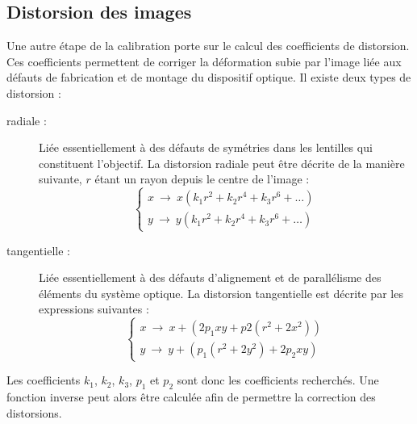 \documentclass[a4paper, 11pt]{article}
\begin{document}
	\subsection*{Distorsion des images}
		Une autre étape de la calibration porte sur le calcul des coefficients de distorsion. Ces coefficients permettent de corriger la déformation subie par l'image liée aux défauts de fabrication et de montage du dispositif optique. Il existe deux types de distorsion :
		\begin{description}
			\item[radiale :] Liée essentiellement à des défauts de symétries dans les lentilles qui constituent l'objectif. La distorsion radiale peut être décrite de la manière suivante, $r$ étant un rayon depuis le centre de l'image :
			\begin{equation}
				\left\{\begin{array}{l}
					x\ \rightarrow\ x\left( k_1r^2 + k_2r^4 + k_3r^6 + \dots \right)\\
					y\ \rightarrow\ y\left( k_1r^2 + k_2r^4 + k_3r^6 + \dots \right)
				\end{array}\right.
			\end{equation}
			\item[tangentielle :] Liée essentiellement à des défauts d'alignement et de parallélisme des éléments du système optique. La distorsion tangentielle est décrite par les expressions suivantes :
			\begin{equation}
				\left\{\begin{array}{l}
					x\ \rightarrow\ x + \left(2p_1xy + p2 \left( r^2 + 2x^2 \right) \right)\\
					y\ \rightarrow\ y + \left( p_1 \left( r^2 + 2y^2 \right) + 2p_2xy \right)
				\end{array}\right.
			\end{equation}
		\end{description}
	Les coefficients $k_1$, $k_2$, $k_3$, $p_1$ et $p_2$ sont donc les coefficients recherchés. Une fonction inverse peut alors être calculée afin de permettre la correction des distorsions.
	\newpage
\end{document}
